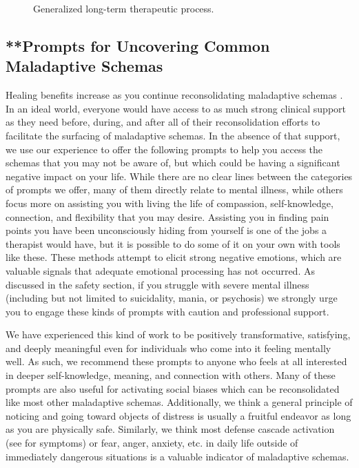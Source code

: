 \documentclass[12pt,letterpaper]{book}
\begin{document}
\begin{figure}[h!]
\begin{framed}
\begin{tikzpicture}[on grid, node distance=1.5cm]
\end{tikzpicture}
\end{framed}
\caption{Generalized long-term therapeutic process.}
\label{fig:process}
\end{figure}
\FloatBarrier
\subsection{**Prompts for Uncovering Common Maladaptive Schemas}
\label{uncovering}
Healing benefits increase as you continue reconsolidating maladaptive schemas \cite{eckerUnlocking}. In an ideal world, everyone would have access to as much strong clinical support as they need before, during, and after all of their reconsolidation efforts to facilitate the surfacing of maladaptive schemas. In the absence of that support, we use our experience to offer the following prompts to help you access the schemas that you may not be aware of, but which could be having a significant negative impact on your life. While there are no clear lines between the categories of prompts we offer, many of them directly relate to mental illness, while others focus more on assisting you with living the life of compassion, self-knowledge, connection, and flexibility that you may desire. Assisting you in finding pain points you have been unconsciously hiding from yourself is one of the jobs a therapist would have, but it is possible to do some of it on your own with tools like these. These methods attempt to elicit strong negative emotions, which are valuable signals that adequate emotional processing has not occurred. As discussed in the safety section, if you struggle with severe mental illness (including but not limited to suicidality, mania, or psychosis) we strongly urge you to engage these kinds of prompts with caution and professional support.

We have experienced this kind of work to be positively transformative, satisfying, and deeply meaningful even for individuals who come into it feeling mentally well. As such, we recommend these prompts to anyone who feels at all interested in deeper self-knowledge, meaning, and connection with others. Many of these prompts are also useful for activating social biases which can be reconsolidated like most other maladaptive schemas. Additionally, we think a general principle of noticing and going toward objects of distress is usually a fruitful endeavor as long as you are physically safe. Similarly, we think most defense cascade activation (see \textcite{cheetahSigns} for symptoms) or fear, anger, anxiety, etc. in daily life outside of immediately dangerous situations is a valuable indicator of maladaptive schemas.
\end{document}
